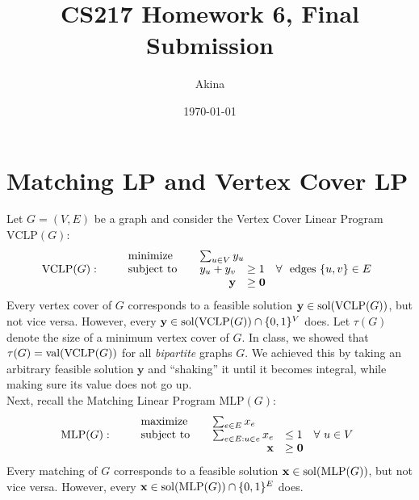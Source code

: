 \documentclass[11pt,a4paper,oneside]{article}
\newcommand{\x}{\mathbf{x}}
\newcommand{\y}{\mathbf{y}}
\newcommand{\sol}{\textup{\textrm{sol}}}
\newcommand{\val}{\textnormal{val}}
\renewcommand{\hwtitle} {CS217 Homework 6, Final Submission}
\renewcommand{\hwauthor}{Akina}
\renewcommand{\hwdate}{\today}
\begin{document}
\title{\hwtitle}
\author{\hwauthor}
\date{\hwdate}
\maketitle


\section*{Matching LP and Vertex Cover LP}



Let $G=(V,E)$ be a 
graph and consider the Vertex Cover Linear Program $\textrm{VCLP}(G)$:
\begin{align*}
\textrm{VCLP($G$)}: \qquad
\begin{array}{lrl}
\textnormal{minimize} \quad & \multicolumn{2}{l}{\sum_{u \in V} y_u} \\
\textnormal{subject to} \quad & y_u + y_v  & \geq 1 \quad \forall\ \textnormal{ edges } \{u,v\} \in E\\
& \y & \geq \mathbf{0}  
\end{array}
\end{align*}
Every vertex cover of $G$ corresponds to a feasible solution $\y \in \sol(\textrm{VCLP}(G))$, but not 
vice versa. However, every $\y \in \sol(\textrm{VCLP}(G)) \cap \{0,1\}^V$ does.
Let $\tau(G)$ denote the size of a minimum vertex cover of $G$. In class, we showed that
$\tau(G) = \val(\textrm{VCLP}(G))$ for all {\em bipartite} graphs $G$. We achieved this by taking
an arbitrary feasible solution $\y$ and ``shaking'' it until it becomes integral, while making sure
its value does not go up.\\


Next, recall the Matching Linear Program $\textrm{MLP}(G)$:
\begin{align*}
\textrm{MLP($G$)}: \qquad
\begin{array}{lrl}
\textnormal{maximize} \quad & \multicolumn{2}{l}{\sum_{e \in E} x_e} \\
\textnormal{subject to} \quad & \sum_{e \in E: u \in e} x_e  & \leq 1 \quad \forall\ u \in V \\
& \x & \geq \mathbf{0}  
\end{array}
\end{align*}
Every matching of $G$ corresponds to a feasible solution $\x \in \sol(\textrm{MLP}(G))$, but not 
vice versa. However, every $\x \in \sol(\textrm{MLP}(G)) \cap \{0,1\}^E$ does.
\end{document}
